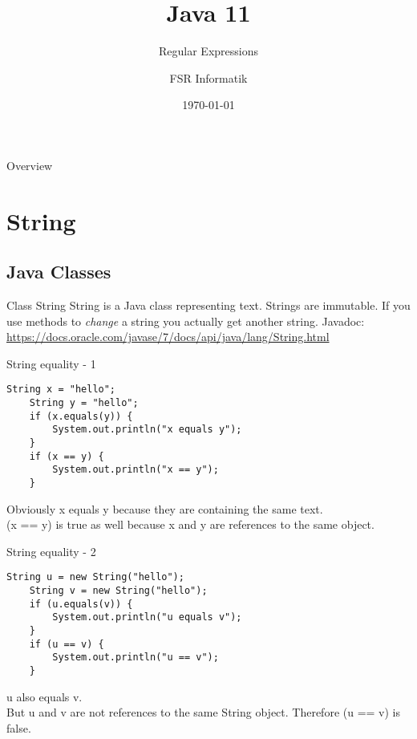 

\title{Java 11}
\subtitle{Regular Expressions}
\author{FSR Informatik}
\date{\today}



\begin{frame}
\titlepage
\end{frame}

\begin{frame}{Overview}
\tableofcontents
\end{frame}

\section{String}
\subsection{Java Classes}
\begin{frame}{Class String}
	String is a Java class representing text.
	\vfill
	Strings are immutable. If you use methods to \emph{change} a string you actually get another string.
	\vfill
	Javadoc: \\
	\scriptsize
	\url{https://docs.oracle.com/javase/7/docs/api/java/lang/String.html}
\end{frame}

\begin{frame}[fragile]{String equality - 1}
	\begin{lstlisting}[basicstyle=\ttfamily\scriptsize]
	String x = "hello";
	String y = "hello";
	if (x.equals(y)) {
	    System.out.println("x equals y");
	}
	if (x == y) {
	    System.out.println("x == y");
	}
	\end{lstlisting}
	\vfill
	Obviously x equals y because they are containing the same text. \\
	(x == y) is true as well because x and y are references to the same object.
\end{frame}

\begin{frame}[fragile]{String equality - 2}
	\begin{lstlisting}[basicstyle=\ttfamily\scriptsize]
	String u = new String("hello");
	String v = new String("hello");
	if (u.equals(v)) {
	    System.out.println("u equals v");
	}
	if (u == v) {
	    System.out.println("u == v");
	}
	\end{lstlisting}
	\vfill
	u also equals v. \\
	But u and v are not references to the same String object.
	Therefore (u == v) is false.
\end{frame}

